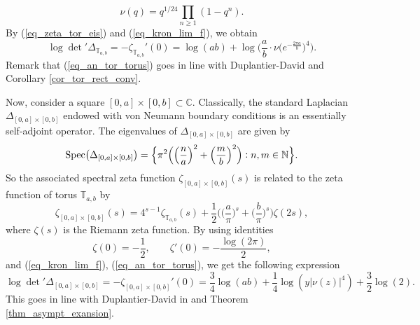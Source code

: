 \documentclass[12pt]{article}
\numberwithin{equation}{section}
\theoremstyle{theorem}
\theoremstyle{definition}
\theoremstyle{remark}
\newcommand{\comp}{\mathbb{C}}
\newcommand{\nat}{\mathbb{N}}
\newcommand{\spec}{{\rm{Spec}}}
\begin{document}
	\begin{equation}
		\nu(q) = q^{1/24} \prod_{n \geq 1} (1 - q^n).
	\end{equation}
	By (\ref{eq_zeta_tor_eis}) and (\ref{eq_kron_lim_f}), we obtain
	\begin{equation}\label{eq_an_tor_torus}
		\log \det{}' \Delta_{\mathbb{T}_{a,b}}
		=
		-\zeta_{\mathbb{T}_{a,b}}'(0)  
		=
		\log(ab)
		+
		\log \Big(  \frac{a}{b}  \cdot \nu \big( e^{- \frac{2 \pi a}{b}} \big)^4 \Big).
	\end{equation}
	Remark that (\ref{eq_an_tor_torus}) goes in line with Duplantier-David \cite[(3.18)]{DuplDav} and Corollary \ref{cor_tor_rect_conv}.
	\par 
	Now, consider a square $[0, a] \times [0, b] \subset \comp$. Classically, the standard Laplacian $\Delta_{[0, a] \times [0, b]}$ endowed with von Neumann boundary conditions is an essentially self-adjoint operator.
	The eigenvalues of  $\Delta_{[0, a] \times [0, b]}$ are given by
	\begin{equation}
		\spec \big( \Delta_{[0, a] \times [0, b]} \big) 
		=
		\Big \{
			\pi^2 \Big(
				\Big( \frac{n}{a} \Big)^2 + \Big( \frac{m}{b} \Big)^2
			\Big)
			:
			n, m \in \nat
		\Big \}.
	\end{equation}
	So the associated spectral zeta function $\zeta_{[0, a] \times [0, b]}(s)$ is related to the zeta function of torus $\mathbb{T}_{a, b}$ by 
	\begin{equation}
		\zeta_{[0, a] \times [0, b]}(s) 
		= 
		4^{s - 1} \zeta_{\mathbb{T}_{a, b}}(s) 
		+
		\frac{1}{2} \Big( 
			\Big( \frac{a}{\pi} \Big)^s + \Big(  \frac{b}{\pi} \Big)^s
		\Big)
		\zeta(2s),
	\end{equation}
	where $\zeta(s)$ is the Riemann zeta function.
	By using identities
	\begin{equation}
		\zeta(0) = -\frac{1}{2}, \qquad \zeta'(0) = - \frac{\log(2\pi)}{2},
	\end{equation}
	and (\ref{eq_kron_lim_f}), (\ref{eq_an_tor_torus}), we get the following expression
	\begin{equation}\label{eq_an_tors_rect}
		\log \det{}' \Delta_{[0, a] \times [0, b]}
		=
		-\zeta_{[0, a] \times [0, b]}'(0)  
		=
		\frac{3}{4} \log(ab) 
		+ 
		\frac{1}{4} \log(y |\nu(z)|^4)
		+
		\frac{3}{2} \log(2).
	\end{equation}
	This goes in line with Duplantier-David in \cite[(4.7) and (4.23)]{DuplDav} and Theorem \ref{thm_asympt_exansion}.
	
\end{document}
